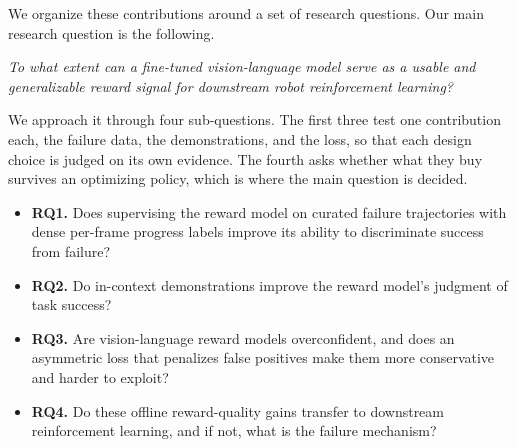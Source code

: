 We organize these contributions around a set of research questions. Our main research question is the following.

\noindent\textit{To what extent can a fine-tuned vision-language model serve as a usable and generalizable reward signal for downstream robot reinforcement learning?}

\noindent We approach it through four sub-questions. The first three test one contribution each, the failure data, the demonstrations, and the loss, so that each design choice is judged on its own evidence. The fourth asks whether what they buy survives an optimizing policy, which is where the main question is decided.
\begin{itemize}
    \item \textbf{RQ1.} Does supervising the reward model on curated failure trajectories with dense per-frame progress labels improve its ability to discriminate success from failure?
    \item \textbf{RQ2.} Do in-context demonstrations improve the reward model's judgment of task success?
    \item \textbf{RQ3.} Are vision-language reward models overconfident, and does an asymmetric loss that penalizes false positives make them more conservative and harder to exploit?
    \item \textbf{RQ4.} Do these offline reward-quality gains transfer to downstream reinforcement learning, and if not, what is the failure mechanism?
\end{itemize}
